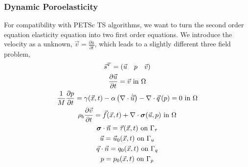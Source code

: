 \documentclass[aspectratio=169,hyperref=colorlinks]{beamer}
\begin{document}
\begin{frame}
  \frametitle{Dynamic Poroelasticity}
{\small
  For compatibility with PETSc TS algorithms, we want to turn the second
order equation elasticity equation into two first order equations. We
introduce the velocity as a unknown,
$\vec{v}=\frac{\partial u}{\partial t}$, which leads to a slightly
different three field problem,
\begin{gather*}
\vec{s}^{T} = \left(\vec{u} \quad p \quad \vec{v}\right) \\
\frac{\partial \vec{u}}{\partial t} = \vec{v} \text{ in } \Omega \\
\frac{1}{M}\frac{\partial p}{\partial t }  =  \gamma(\vec{x},t) - \alpha \left(\nabla \cdot \dot{\vec{u}} \right) - \nabla \cdot \vec{q}\left(p\right) = 0 \text{ in } \Omega \\
\rho_{b} \frac{\partial \vec{v}}{\partial t} = \vec{f}(\vec{x},t) + \nabla \cdot \bm{\sigma}(\vec{u},p) \text{ in } \Omega \\
\bm{\sigma} \cdot \vec{n} = \vec{\tau}(\vec{x},t) \text{ on } \Gamma_{\tau} \\
\vec{u} = \vec{u}_{0}(\vec{x}, t) \text{ on } \Gamma_{u} \\
\vec{q} \cdot \vec{n} = q_{0}(\vec{x}, t) \text{ on } \Gamma_{q} \\
p = p_{0}(\vec{x},t) \text{ on } \Gamma_{p}
\end{gather*}}
  
\end{frame}
\end{document}
